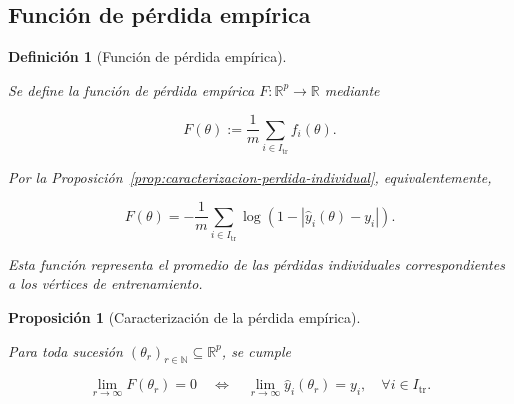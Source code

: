 \documentclass[a4paper,openany,oneside,10pt]{report}
\theoremstyle{pnlTeorema}
\newtheorem{proposicion}{Proposición}[section]
\theoremstyle{pnlDefinicion}
\newtheorem{definicion}{Definición}[section]
\theoremstyle{pnlObservacion}
\begin{document}
\subsection{Función de pérdida empírica}

\begin{definicion}[Función de pérdida empírica]\label{def:perdida-empirica}

Se define la función de pérdida empírica
$F:\mathbb{R}^p\to\mathbb{R}$ mediante

\[
F(\theta):=\frac{1}{m}\sum_{i\in I_{\mathrm{tr}}}f_i(\theta).
\]

Por la Proposición~\ref{prop:caracterizacion-perdida-individual}, equivalentemente,

\[
\boxed{
F(\theta)
=-\frac{1}{m}\sum_{i\in I_{\mathrm{tr}}}
\log\left(1-|\hat y_i(\theta)-y_i|\right).
}
\]

Esta función representa el promedio de las pérdidas individuales correspondientes a los vértices de entrenamiento.

\end{definicion}

\begin{proposicion}[Caracterización de la pérdida empírica]\label{prop:caracterizacion-perdida-empirica}

Para toda sucesión
$(\theta_r)_{r\in\mathbb{N}}\subseteq\mathbb{R}^p$,
se cumple

\[
\boxed{
\lim_{r\to\infty}F(\theta_r)=0
\quad\Longleftrightarrow\quad
\lim_{r\to\infty}\hat y_i(\theta_r)=y_i,
\quad \forall i\in I_{\mathrm{tr}}.
}
\]

\end{proposicion}
\end{document}
